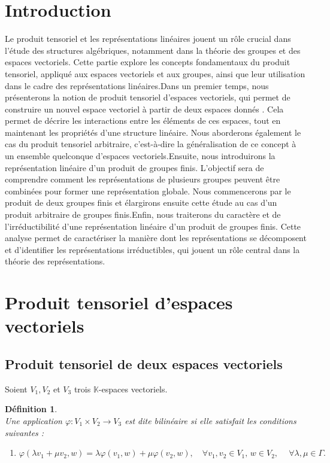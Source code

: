 \documentclass[a4paper, 14pt]{report}
\newtheorem{definition}{Définition}[section]
\begin{document}
\begin{onehalfspace}
{			\section*{Introduction}
			Le produit tensoriel et les représentations linéaires jouent un rôle crucial dans l'étude des structures algébriques, notamment dans la théorie des groupes et des espaces vectoriels. Cette partie explore les concepts fondamentaux du produit tensoriel, appliqué aux espaces vectoriels et aux groupes, ainsi que leur utilisation dans le cadre des représentations linéaires.Dans un premier temps, nous présenterons la notion de produit tensoriel d’espaces vectoriels, qui permet de construire un nouvel espace vectoriel à partir de deux espaces donnés \cite{greub2012linear}. Cela permet de décrire les interactions entre les éléments de ces espaces, tout en maintenant les propriétés d'une structure linéaire. Nous aborderons également le cas du produit tensoriel arbitraire, c'est-à-dire la généralisation de ce concept à un ensemble quelconque d'espaces vectoriels.Ensuite, nous introduirons la représentation linéaire d’un produit de groupes finis. L'objectif sera de comprendre comment les représentations de plusieurs groupes peuvent être combinées pour former une représentation globale. Nous commencerons par le produit de deux groupes finis \cite{serre1971representation} et élargirons ensuite cette étude au cas d'un produit arbitraire de groupes finis.Enfin, nous traiterons du caractère et de l’irréductibilité d’une représentation linéaire d’un produit de groupes finis. Cette analyse permet de caractériser la manière dont les représentations se décomposent et d'identifier les représentations irréductibles, qui jouent un rôle central dans la théorie des représentations.
			
			
			\section{Produit tensoriel d'espaces vectoriels}
			\subsection{Produit tensoriel de deux espaces vectoriels}
			Soient \( V_1 , V_2 \) et \(V_3\) trois \(\mathbb{K}\)-espaces vectoriels.
			\begin{definition} \cite{greub2012linear}\\
				Une application \(\varphi : V_1 \times V_2 \to V_3 \) est dite bilinéaire si elle satisfait les conditions suivantes :
				\begin{enumerate}[label=\roman*)]
					\item \(\varphi(\lambda v_1 + \mu v_2, w) = \lambda \varphi(v_1, w) + \mu \varphi(v_2, w), \quad \forall v_1, v_2 \in V_1, \, w \in V_2, \ \quad \forall \lambda, \mu \in \Gamma. \)
					

\end{enumerate}
\end{definition}}
\end{onehalfspace}
\end{document}
